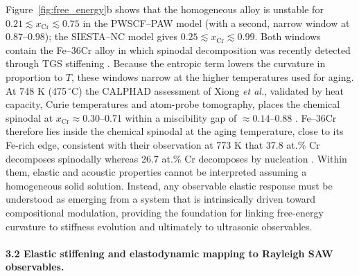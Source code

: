 \documentclass[final,3p,times]{elsarticle}
\begin{document}
Figure~\ref{fig:free_energy}b shows that the homogeneous alloy is unstable for $0.21 \lesssim x_{\mathrm{Cr}} \lesssim 0.75$ in the PWSCF--PAW model (with a second, narrow window at $0.87$--$0.98$); the SIESTA--NC model gives $0.25 \lesssim x_{\mathrm{Cr}} \lesssim 0.99$. Both windows contain the Fe--36Cr alloy in which spinodal decomposition was recently detected through TGS stiffening \cite{rae2026tgs}. Because the entropic term lowers the curvature in proportion to $T$, these windows narrow at the higher temperatures used for aging. At 748 K (475\,$^\circ$C) the CALPHAD assessment of Xiong \textit{et al.}, validated by heat capacity, Curie temperatures and atom-probe tomography, places the chemical spinodal at $x_{\mathrm{Cr}}\approx0.30$--0.71 within a miscibility gap of $\approx0.14$--0.88 \cite{xiong2011improved}. Fe--36Cr therefore lies inside the chemical spinodal at the aging temperature, close to its Fe-rich edge, consistent with their observation at 773 K that 37.8 at.\% Cr decomposes spinodally whereas 26.7 at.\% Cr decomposes by nucleation \cite{xiong2011improved}. Within them, elastic and acoustic properties cannot be interpreted assuming a homogeneous solid solution. Instead, any observable elastic response must be understood as emerging from a system that is intrinsically driven toward compositional modulation, providing the foundation for linking free-energy curvature to stiffness evolution and ultimately to ultrasonic observables.

\paragraph{3.2 Elastic stiffening and elastodynamic mapping to Rayleigh SAW observables.}
\end{document}
